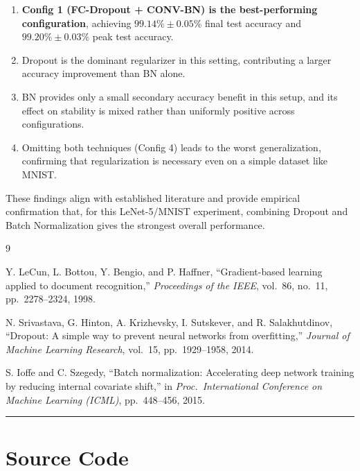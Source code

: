 \documentclass[11pt]{article}
\begin{document}
\begin{enumerate}
  \item \textbf{Config 1 (FC-Dropout + CONV-BN) is the best-performing configuration},
    achieving $99.14\% \pm 0.05\%$ final test accuracy and $99.20\% \pm 0.03\%$ peak
    test accuracy.
  \item Dropout is the dominant regularizer in this setting, contributing a larger
    accuracy improvement than BN alone.
  \item BN provides only a small secondary accuracy benefit in this setup, and its
    effect on stability is mixed rather than uniformly positive across configurations.
  \item Omitting both techniques (Config 4) leads to the worst generalization, confirming
        that regularization is necessary even on a simple dataset like MNIST.
\end{enumerate}

These findings align with established literature and provide empirical confirmation that,
for this LeNet-5/MNIST experiment, combining Dropout and Batch Normalization gives the
strongest overall performance.

\begin{thebibliography}{9}

  Y. LeCun, L. Bottou, Y. Bengio, and P. Haffner,
  ``Gradient-based learning applied to document recognition,''
  \textit{Proceedings of the IEEE}, vol.\ 86, no.\ 11, pp.\ 2278--2324, 1998.

  N. Srivastava, G. Hinton, A. Krizhevsky, I. Sutskever, and R. Salakhutdinov,
  ``Dropout: A simple way to prevent neural networks from overfitting,''
  \textit{Journal of Machine Learning Research}, vol.\ 15, pp.\ 1929--1958, 2014.

  S. Ioffe and C. Szegedy,
  ``Batch normalization: Accelerating deep network training by reducing internal covariate shift,''
  in \textit{Proc.\ International Conference on Machine Learning (ICML)}, pp.\ 448--456, 2015.

\end{thebibliography}

\vspace{0.5cm}
\hrule
\vspace{0.5cm}

\appendix
\section{Source Code}




\end{document}
